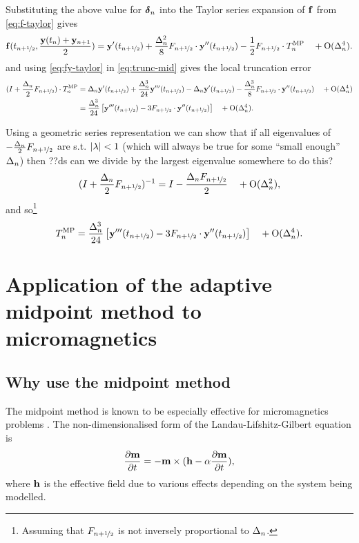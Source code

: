Substituting the above value for $\dyn$ into the Taylor series expansion of $\fv$ from \eqref{eq:f-taylor} gives
\begin{equation}
  \fv(\thf, \frac{\yv(t_n) + \yv_{n+1}}{2}) = \yvhf[']
  + \frac{\dtn^2}{8} \dfdyhf \cdot \yvhf[''] - \frac{1}{2} \dfdyhf \cdot \lte^\IMP \porder{\dtn^4}
  . \label{eq:fy-taylor}
\end{equation}
and using \eqref{eq:fy-taylor} in \eqref{eq:trunc-mid} gives the local truncation error
\begin{align}
  (I + \frac{\dtn}{2}\dfdyhf) \cdot\lte^\IMP
  &= \dtn \yvhf['] + \frac{\dtn^3}{24} \yvhf[''']
  - \dtn \yvhf[']
  - \frac{\dtn^3}{8} \dfdyhf \cdot \yvhf[''] \porder{\dtn^4}
  \notag \\
  &= \frac{\dtn^3}{24} \left[\yvhf['''] - 3 \dfdyhf \cdot \yvhf[''] \right]
  \porder{\dtn^4}.
  \label{eq:trunc-implicit-form}
\end{align}

Using a geometric series representation we can show that if all eigenvalues of  $-\frac{\dtn}{2}\dfdyhf$ are s.t. $\abs{\lambda} < 1$\cite{??ds} (which will always be true for some ``small enough'' $\dtn$) then
??ds can we divide by the largest eigenvalue somewhere to do this?
\begin{equation}
  (I + \frac{\dtn}{2}\dfdyhf)^{-1} = I - \frac{\dtn \dfdyhf}{2}  \porder{\dtn^2},
\end{equation}
and so\footnote{Assuming that $\dfdyhf$ is not inversely proportional to $\dtn$.}
\begin{equation}
  \lte^\IMP = \frac{\dtn^3}{24} \left[\yvhf['''] - 3 \dfdyhf \cdot \yvhf[''] \right]
  \quad +\order{\dtn^4}.
  \label{eq:trunc-final}
\end{equation}



\section{Application of the adaptive midpoint method to micromagnetics}


\subsection{Why use the midpoint method}

The midpoint method is known to be especially effective for micromagnetics problems \cite{DAquino2005}.
The non-dimensionalised form of the Landau-Lifshitz-Gilbert equation is
\begin{equation}
  \label{eq:llg-prop-form}
  \dmdt = - \mv \times( \hv - \dampc \dmdt),
\end{equation}
where $\hv$ is the effective field due to various effects depending on the system being modelled.

